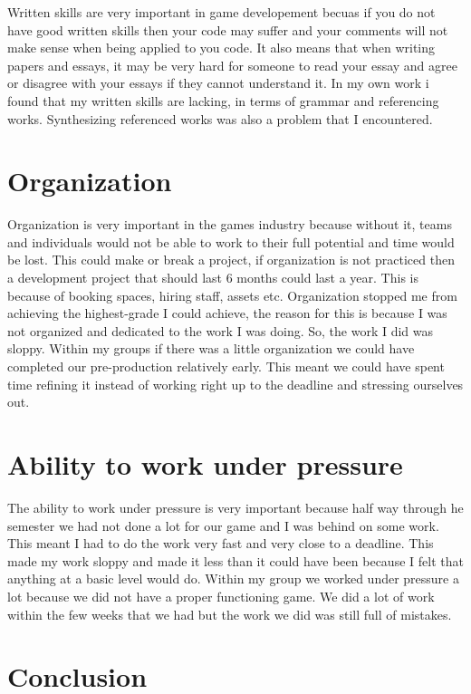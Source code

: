 \documentclass[11pt]{scrartcl}
\begin{document}
Written skills are very important in game developement becuas if you do not have good written skills then your code may suffer and your comments will not make sense when being applied to you code. It also means that when writing papers and essays, it may be very hard for someone to read your essay and agree or disagree with your essays if they cannot understand it. In my own work i found that my written skills are lacking, in terms of grammar and referencing works. Synthesizing referenced works was also a problem that I encountered.

\section {Organization}

Organization is very important in the games industry because without it, teams and individuals would not be able to work to their full potential and time would be lost. This could make or break a project, if organization is not practiced then a development project that should last 6 months could last a year. This is because of booking spaces, hiring staff, assets etc. Organization stopped me from achieving the highest-grade I could achieve, the reason for this is because I was not organized and dedicated to the work I was doing. So, the work I did was sloppy. Within my groups if there was a little organization we could have completed our pre-production relatively early. This meant we could have spent time refining it instead of working right up to the deadline and stressing ourselves out.

\section {Ability to work under pressure}

The ability to work under pressure is very important because half way through he semester we had not done a lot for our game and I was behind on some work. This meant I had to do the work very fast and very close to a deadline. This made my work sloppy and made it less than it could have been because I felt that anything at a basic level would do. Within my group we worked under pressure a lot because we did not have a proper functioning game. We did a lot of work within the few weeks that we had but the work we did was still full of mistakes.

\section {Conclusion}
\end{document}
